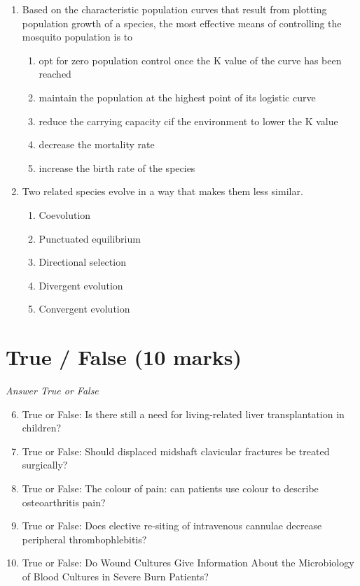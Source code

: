 \documentclass[12pt]{article}
\begin{document}
\begin{enumerate}[label=\arabic*.]
\begin{enumerate}[label=(\alph*)]
    \item Appetitive behavior, termination, consummatory act
\end{enumerate}
\item Based on the characteristic population curves that result from plotting population growth of a species, the most effective means of controlling the mosquito population is to
\begin{enumerate}[label=(\alph*)]
    \item opt for zero population control once the K value of the curve has been reached
    \item maintain the population at the highest point of its logistic curve
    \item reduce the carrying capacity cif the environment to lower the K value
    \item decrease the mortality rate
    \item increase the birth rate of the species
\end{enumerate}
\item Two related species evolve in a way that makes them less similar.
\begin{enumerate}[label=(\alph*)]
    \item Coevolution
    \item Punctuated equilibrium
    \item Directional selection
    \item Divergent evolution
    \item Convergent evolution
\end{enumerate}
\end{enumerate}

\section*{True / False (10 marks)}
\textit{Answer True or False}
\begin{enumerate}[label=\arabic*.]
\setcounter{enumi}{5}
\item True or False: Is there still a need for living-related liver transplantation in children?
\item True or False: Should displaced midshaft clavicular fractures be treated surgically?
\item True or False: The colour of pain: can patients use colour to describe osteoarthritis pain?
\item True or False: Does elective re-siting of intravenous cannulae decrease peripheral thrombophlebitis?
\item True or False: Do Wound Cultures Give Information About the Microbiology of Blood Cultures in Severe Burn Patients?
\end{enumerate}
\end{document}
